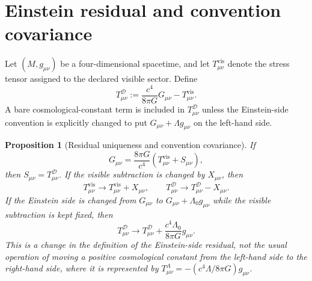 \documentclass[
  aps,
  prd,
  reprint,
  superscriptaddress,
  floatfix,
  nofootinbib,
  longbibliography
]{revtex4-2}
\theoremstyle{plain}
\newtheorem{proposition}[theorem]{Proposition}
\theoremstyle{definition}
\theoremstyle{remark}
\newcommand{\D}{\mathcal D}
\newcommand{\vis}{\mathrm{vis}}
\begin{document}
\section{Einstein residual and convention covariance}

Let \((M,g_{\mu\nu})\) be a four-dimensional spacetime, and let
\(T^{\vis}_{\mu\nu}\) denote the stress tensor assigned to the declared visible
sector.  Define
\begin{equation}
\boxed{
T^\D_{\mu\nu}:=
\frac{c^4}{8\pi G}G_{\mu\nu}-T^{\vis}_{\mu\nu} .
}
\label{eq:primitive_residual_v5}
\end{equation}
A bare cosmological-constant term is included in \(T^\D_{\mu\nu}\) unless the
Einstein-side convention is explicitly changed to put \(G_{\mu\nu}+\Lambda
 g_{\mu\nu}\) on the left-hand side.

\begin{proposition}[Residual uniqueness and convention covariance]
If
\begin{equation}
G_{\mu\nu}=\frac{8\pi G}{c^4}\left(T^{\vis}_{\mu\nu}+S_{\mu\nu}\right),
\end{equation}
then \(S_{\mu\nu}=T^\D_{\mu\nu}\).  If the visible subtraction is changed by
\(X_{\mu\nu}\), then
\begin{equation}
T^{\vis}_{\mu\nu}\to T^{\vis}_{\mu\nu}+X_{\mu\nu},
\qquad
T^\D_{\mu\nu}\to T^\D_{\mu\nu}-X_{\mu\nu} .
\end{equation}
If the Einstein side is changed from \(G_{\mu\nu}\) to
\(G_{\mu\nu}+\Lambda_0g_{\mu\nu}\) while the visible subtraction is kept fixed,
then
\begin{equation}
T^\D_{\mu\nu}\to T^\D_{\mu\nu}+\frac{c^4\Lambda_0}{8\pi G}g_{\mu\nu} .
\end{equation}
This is a change in the definition of the Einstein-side residual, not the usual
operation of moving a positive cosmological constant from the left-hand side to
the right-hand side, where it is represented by
\(T^\Lambda_{\mu\nu}=-(c^4\Lambda/8\pi G)g_{\mu\nu}\).
\end{proposition}
\end{document}

